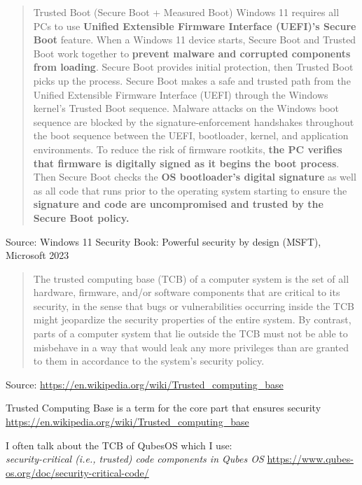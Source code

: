 \documentclass[Screen16to9,17pt]{foils}
\begin{document}


\begin{quote}
Trusted Boot (Secure Boot + Measured Boot)
Windows 11 requires all PCs to use {\bf Unified Extensible Firmware Interface (UEFI)’s Secure
Boot} feature. When a Windows 11 device starts, Secure Boot and Trusted Boot work together
to {\bf prevent malware and corrupted components from loading}. Secure Boot provides initial
protection, then Trusted Boot picks up the process.
Secure Boot makes a safe and trusted path from the Unified Extensible Firmware Interface
(UEFI) through the Windows kernel’s Trusted Boot sequence. Malware attacks on the
Windows boot sequence are blocked by the signature-enforcement handshakes throughout
the boot sequence between the UEFI, bootloader, kernel, and application environments.
To reduce the risk of firmware rootkits, {\bf the PC verifies that firmware is digitally signed as it
begins the boot process}. Then Secure Boot checks the {\bf OS bootloader’s digital signature} as
well as all code that runs prior to the operating system starting to ensure the {\bf signature and
code are uncompromised and trusted by the Secure Boot policy.}
\end{quote}
Source: Windows 11 Security Book: Powerful security by design (MSFT), Microsoft 2023



\begin{quote}
The trusted computing base (TCB) of a computer system is the set of all hardware, firmware, and/or software components that are critical to its security, in the sense that bugs or vulnerabilities occurring inside the TCB might jeopardize the security properties of the entire system. By contrast, parts of a computer system that lie outside the TCB must not be able to misbehave in a way that would leak any more privileges than are granted to them in accordance to the system's security policy.
\end{quote}
Source: \url{https://en.wikipedia.org/wiki/Trusted_computing_base}

\begin{list2}
\item Trusted Computing Base is a term for the core part that ensures security\\
\url{https://en.wikipedia.org/wiki/Trusted_computing_base}
\item I often talk about the TCB of QubesOS which I use:\\
\emph{security-critical (i.e., trusted) code components in Qubes OS}
\url{https://www.qubes-os.org/doc/security-critical-code/}
\end{list2}
\end{document}
